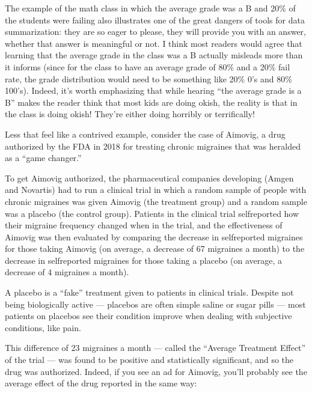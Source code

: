\documentclass[letterpaper,10pt,english]{jupyterBook}
\begin{document}
\sphinxAtStartPar
The example of the math class in which the average grade was a B\sphinxhyphen{} and 20\% of the students were failing also illustrates one of the great dangers of tools for data summarization: they are so eager to please, they will  provide you with an answer, whether that answer is meaningful or not. I think most readers would agree that learning that the average grade in the class was a B\sphinxhyphen{} actually misleads more than it informs (since for the class to have an average grade of 80\% and a 20\% fail rate, the grade distribution would need to be something like 20\% 0’s and 80\% 100’s). Indeed, it’s worth emphasizing that while hearing “the average grade is a B\sphinxhyphen{}” makes the reader think that most kids are doing ok\sphinxhyphen{}ish, the reality is that  in the class is doing ok\sphinxhyphen{}ish! They’re either doing horribly or terrifically!

\sphinxAtStartPar
Less that feel like a contrived example, consider the case of Aimovig, a drug authorized by the FDA in 2018 for treating chronic migraines that was heralded as a “game changer.”

\sphinxAtStartPar
To get Aimovig authorized, the pharmaceutical companies developing (Amgen and Novartis) had to run a clinical trial in which a random sample of people with chronic migraines was given Aimovig (the treatment group) and a random sample was a placebo (the control group). Patients in the clinical trial self\sphinxhyphen{}reported how their migraine frequency changed when in the trial, and the effectiveness of Aimovig was then evaluated by comparing the decrease in self\sphinxhyphen{}reported migraines for those taking Aimovig (on average, a decrease of 6\sphinxhyphen{}7 migraines a month) to the decrease in self\sphinxhyphen{}reported migraines for those taking a placebo (on average, a decrease of 4 migraines a month).%
\begin{footnote}[2]\sphinxAtStartFootnote
A placebo is a “fake” treatment given to patients in clinical trials. Despite not being biologically active — placebos are often simple saline or sugar pills — most patients on placebos see their condition improve when dealing with subjective conditions, like pain.
%
\end{footnote} This difference of 2\sphinxhyphen{}3 migraines a month — called the “Average Treatment Effect” of the trial — was found to be positive and statistically significant, and so the drug was authorized. Indeed, if you see an ad for Aimovig, you’ll probably see the average effect of the drug reported in the same way:
\end{document}
